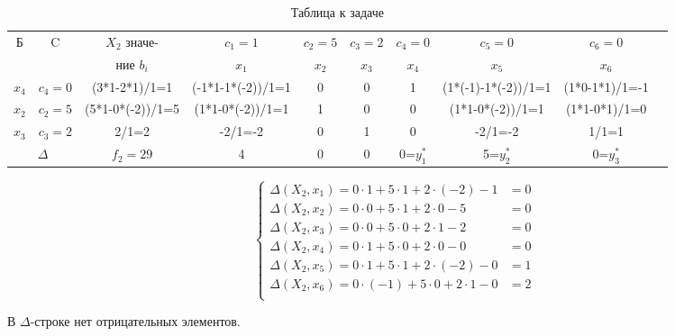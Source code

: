 \begin{table}[h!]
  \scriptsize

  \centering

  \caption{Таблица к задаче}
  \label{tab:4}

  \begin{tabular}{|c|c|c|c|c|c|c|c|c|l|} 
    \hline
    Б     &C                      &$X_2$ значе-         &$c_1=1$            &$c_2=5$  &$c_3=2$  &$c_4=0$  &$c_5=0$              &$c_6=0$    \\
          &                       &ние $b_i$        &$x_1$              &$x_2$    &$x_3$    &$x_4$    &$x_5$                &$x_6$          \\ \hline
    $x_4$ &$c_4=0$                &(3*1-2*1)/1=1    &(-1*1-1*(-2))/1=1  &0        &0        &1        &(1*(-1)-1*(-2))/1=1  &(1*0-1*1)/1=-1 \\ \hline
    $x_2$ &$c_2=5$                &(5*1-0*(-2))/1=5 &(1*1-0*(-2))/1=1   &1        &0        &0        &(1*1-0*(-2))/1=1     &(1*1-0*1)/1=0  \\ \hline
    $x_3$ &$c_3=2$                &2/1=2            &-2/1=-2            &0        &1        &0        &-2/1=-2              &1/1=1          \\ \hline
    \multicolumn{2}{|c|}{$\Delta$}&$f_2=29$         &4                  &0        &0        &0=$y_1^*$&5=$y_2^*$            &0=$y_3^*$      \\\hline
  \end{tabular}
\end{table}

\begin{equation*}
  \begin{cases}
    \Delta(X_2, x_1) = 0 \cdot 1 + 5 \cdot 1 + 2 \cdot (-2) - 1 &= 0 \\
    \Delta(X_2, x_2) = 0 \cdot 0 + 5 \cdot 1 + 2 \cdot 0 - 5    &= 0 \\
    \Delta(X_2, x_3) = 0 \cdot 0 + 5 \cdot 0 + 2 \cdot 1 - 2    &= 0 \\
    \Delta(X_2, x_4) = 0 \cdot 1 + 5 \cdot 0 + 2 \cdot 0 - 0    &= 0 \\
    \Delta(X_2, x_5) = 0 \cdot 1 + 5 \cdot 1 + 2 \cdot (-2) - 0 &= 1 \\
    \Delta(X_2, x_6) = 0 \cdot (-1) + 5 \cdot 0 + 2 \cdot 1 - 0 &= 2 \\
  \end{cases}
\end{equation*}

В $\Delta$-строке нет отрицательных элементов.

